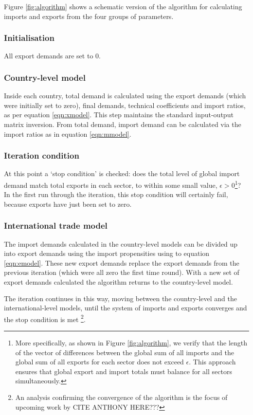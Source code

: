 \documentclass[a4paper]{article}
\begin{document}
Figure \ref{fig:algorithm} shows a schematic version of the algorithm for calculating imports and exports from the four groups of parameters.
\subsubsection*{Initialisation}
All export demands are set to 0.

\subsubsection*{Country-level model}
Inside each country, total demand is calculated using the export demands (which were initially set to zero), final demands, technical coefficients and import ratios, as per equation \eqref{eqn:xmodel}.
This step maintains the standard input-output matrix inversion.
From total demand, import demand can be calculated via the import ratios as in equation \eqref{eqn:mmodel}.

\subsubsection*{Iteration condition}
At this point a `stop condition' is checked: does the total level of global import demand match total exports in each sector, to within some small value,  $\epsilon > 0$\footnote{More specifically, as shown in Figure \ref{fig:algorithm}, we verify that the length of the vector of differences between the global sum of all imports and the global sum of all exports for each sector does not exceed $\epsilon$. This approach ensures that global export and import totals must balance for all sectors simultaneously.}?
In the first run through the iteration, this stop condition will certainly fail, because exports have just been set to zero.

\subsubsection*{International trade model}
The import demands calculated in the country-level models can be divided up into export demands using the import propensities using to equation \eqref{eqn:emodel}.
These new export demands replace the export demands from the previous iteration (which were all zero the first time round).
With a new set of export demands calculated the algorithm returns to the country-level model.

The iteration continues in this way, moving between the country-level and the international-level models, until the system of imports and exports converges and the stop condition is met \footnote{An analysis confirming the convergence of the algorithm is the focus of upcoming work by CITE ANTHONY HERE???}.
\end{document}
